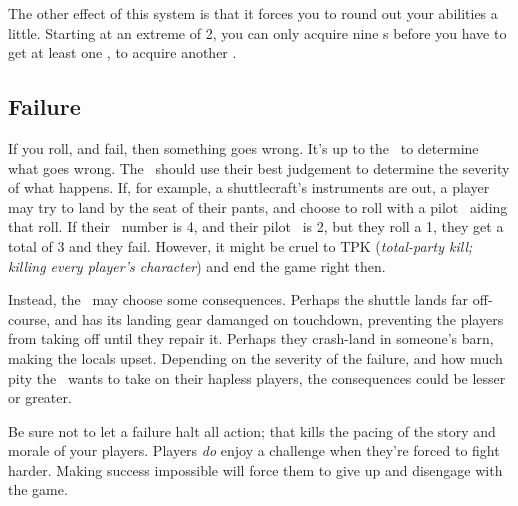 \par
The other effect of this system is that it forces you to round out your abilities a little. Starting at an extreme of 2, you can only acquire nine \lasersxp s before you have to get at least one \feelingsxp, to acquire another \lasersxp .

\subsection{Failure}
If you roll, and fail, then something goes wrong. It's up to the \gm\, to determine what goes wrong. The \gm\, should use their best judgement to determine the severity of what happens. If, for example, a shuttlecraft's instruments are out, a player may try to land by the seat of their pants, and choose to roll with a pilot \skill\, aiding that roll. If their \both\, number is 4, and their pilot \skill\, is 2, but they roll a 1, they get a total of 3 and they fail. However, it might be cruel to TPK (\textit{total-party kill; killing every player's character}) and end the game right then.

\par
Instead, the \gm\, may choose some consequences. Perhaps the shuttle lands far off-course, and has its landing gear damanged on touchdown, preventing the players from taking off until they repair it. Perhaps they crash-land in someone's barn, making the locals upset. Depending on the severity of the failure, and how much pity the \gm\, wants to take on their hapless players, the consequences could be lesser or greater.

\par
Be sure not to let a failure halt all action; that kills the pacing of the story and morale of your players. Players \textit{do} enjoy a challenge when they're forced to fight harder. Making success impossible will force them to give up and disengage with the game.